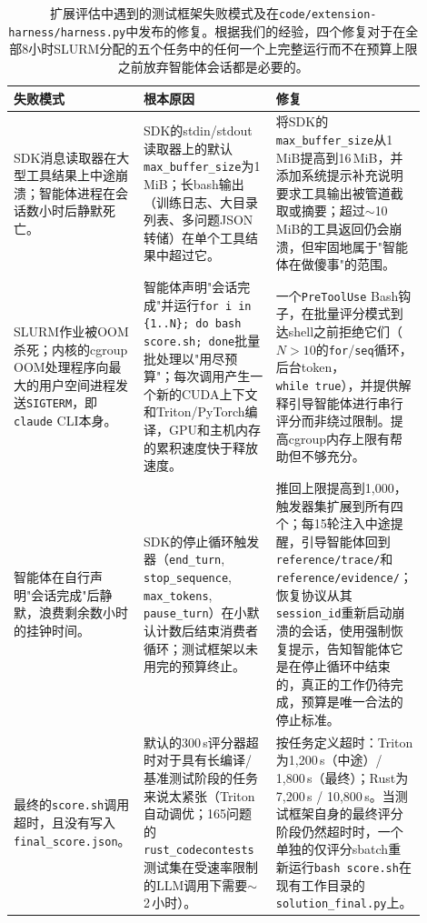 \begin{table}[h]
\centering
\small
\begin{tabular}{p{0.22\linewidth} p{0.32\linewidth} p{0.36\linewidth}}
\toprule
\textbf{失败模式} & \textbf{根本原因} & \textbf{修复} \\
\midrule
SDK消息读取器在大型工具结果上中途崩溃；智能体进程在会话数小时后静默死亡。
& SDK的stdin/stdout读取器上的默认\texttt{max\_buffer\_size}为1\,MiB；长bash输出（训练日志、大目录列表、多问题JSON转储）在单个工具结果中超过它。
& 将SDK的\texttt{max\_buffer\_size}从1\,MiB提高到16\,MiB，并添加系统提示补充说明要求工具输出被管道截取或摘要；超过$\sim$10\,MiB的工具返回仍会崩溃，但牢固地属于"智能体在做傻事"的范围。 \\
\addlinespace
SLURM作业被OOM杀死；内核的cgroup OOM处理程序向最大的用户空间进程发送\texttt{SIGTERM}，即\texttt{claude} CLI本身。
& 智能体声明"会话完成"并运行\texttt{for i in \{1..N\}; do bash score.sh; done}批量批处理以"用尽预算"；每次调用产生一个新的CUDA上下文和Triton/PyTorch编译，GPU和主机内存的累积速度快于释放速度。
& 一个\texttt{PreToolUse} Bash钩子，在批量评分模式到达shell之前拒绝它们（$N{>}10$的\texttt{for}/\texttt{seq}循环，后台token，\texttt{while~true}），并提供解释引导智能体进行串行评分而非绕过限制。提高cgroup内存上限有帮助但不够充分。 \\
\addlinespace
智能体在自行声明"会话完成"后静默，浪费剩余数小时的挂钟时间。
& SDK的停止循环触发器（\texttt{end\_turn}, \texttt{stop\_sequence}, \texttt{max\_tokens}, \texttt{pause\_turn}）在小默认计数后结束消费者循环；测试框架以未用完的预算终止。
& 推回上限提高到1{,}000，触发器集扩展到所有四个；每15轮注入中途提醒，引导智能体回到\texttt{reference/trace/}和\texttt{reference/evidence/}；恢复协议从其\texttt{session\_id}重新启动崩溃的会话，使用强制恢复提示，告知智能体它是在停止循环中结束的，真正的工作仍待完成，预算是唯一合法的停止标准。 \\
\addlinespace
最终的\texttt{score.sh}调用超时，且没有写入\texttt{final\_score.json}。
& 默认的300\,s评分器超时对于具有长编译/基准测试阶段的任务来说太紧张（Triton自动调优；165问题的\texttt{rust\_codecontests}测试集在受速率限制的LLM调用下需要$\sim$2\,小时）。
& 按任务定义超时：Triton为1{,}200\,s（中途）/ 1{,}800\,s（最终）；Rust为7{,}200\,s / 10{,}800\,s。当测试框架自身的最终评分阶段仍然超时时，一个单独的仅评分sbatch重新运行\texttt{bash score.sh}在现有工作目录的\texttt{solution\_final.py}上。 \\
\bottomrule
\end{tabular}
\caption{扩展评估中遇到的测试框架失败模式及在\texttt{code/extension-harness/harness.py}中发布的修复。根据我们的经验，四个修复对于在全部8小时SLURM分配的五个任务中的任何一个上完整运行而不在预算上限之前放弃智能体会话都是必要的。}
\label{tbl-harness-fixes}
\end{table}

